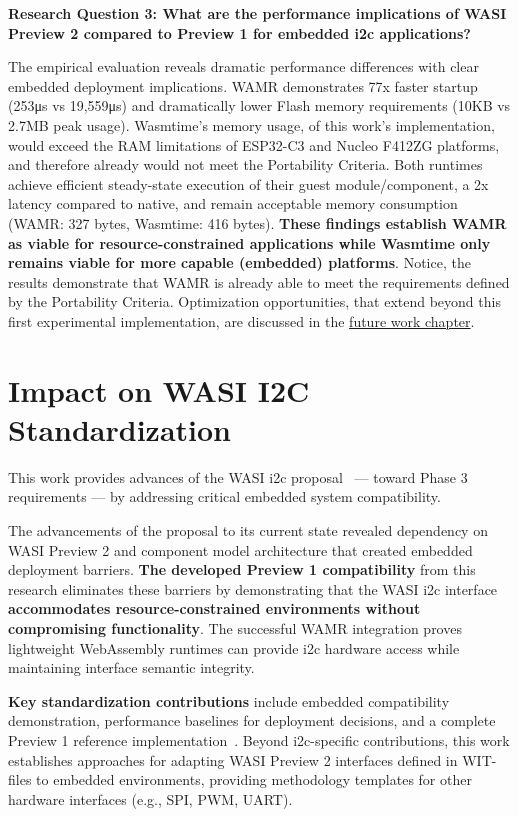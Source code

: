 \textbf{Research Question 3: What are the performance implications of WASI Preview 2 compared to Preview 1 for embedded \acrshort{i2c} applications?}

The empirical evaluation reveals dramatic performance differences with clear embedded deployment implications. WAMR demonstrates 77x faster startup (253μs vs 19,559μs) and dramatically lower Flash memory requirements (10KB vs 2.7MB peak usage). Wasmtime's memory usage, of this work's implementation, would exceed the RAM limitations of ESP32-C3 and Nucleo F412ZG platforms, and therefore already would not meet the Portability Criteria. Both runtimes achieve efficient steady-state execution of their guest module/component, a 2x latency compared to native, and remain acceptable memory consumption (WAMR: 327 bytes, Wasmtime: 416 bytes). \textbf{These findings establish WAMR as viable for resource-constrained applications while Wasmtime only remains viable for more capable (embedded) platforms}. Notice, the results demonstrate that WAMR is already able to meet the requirements defined by the Portability Criteria. Optimization opportunities, that extend beyond this first experimental implementation, are discussed in the \hyperref[chap:future-work]{future work chapter}.

\section*{Impact on WASI I2C Standardization}
\label{sec:standardization-impact}

This work provides advances of the WASI \acrshort{i2c} proposal~\cite{wasi_i2c_proposal} --- toward Phase 3 requirements --- by addressing critical embedded system compatibility.

The advancements of the proposal to its current state revealed dependency on WASI Preview 2 and component model architecture that created embedded deployment barriers. \textbf{The developed Preview 1 compatibility} from this research eliminates these barriers by demonstrating that the WASI \acrshort{i2c} interface \textbf{accommodates resource-constrained environments without compromising functionality}. The successful WAMR integration proves lightweight WebAssembly runtimes can provide \acrshort{i2c} hardware access while maintaining interface semantic integrity.

\textbf{Key standardization contributions} include embedded compatibility demonstration, performance baselines for deployment decisions, and a complete Preview 1 reference implementation~\cite{wamr-wasi-i2c}. Beyond \acrshort{i2c}-specific contributions, this work establishes approaches for adapting WASI Preview 2 interfaces defined in WIT-files to embedded environments, providing methodology templates for other hardware interfaces (e.g., SPI, PWM, UART).

